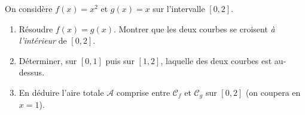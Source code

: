 \documentclass[11pt,a4paper]{article}
\begin{document}
\begin{exo}
On considère $f(x)=x^2$ et $g(x)=x$ sur l'intervalle $[0,2]$.
\begin{enumerate}[label=\alph*),leftmargin=2em,topsep=2pt,itemsep=1pt]
  \item Résoudre $f(x)=g(x)$. Montrer que les deux courbes se croisent \emph{à l'intérieur} de $[0,2]$.
  \item Déterminer, sur $[0,1]$ puis sur $[1,2]$, laquelle des deux courbes est au-dessus.
  \item En déduire l'aire totale $\mathcal{A}$ comprise entre $\mathcal{C}_f$ et $\mathcal{C}_g$ sur $[0,2]$
        (on coupera en $x=1$).
\end{enumerate}
\end{exo}
\end{document}
